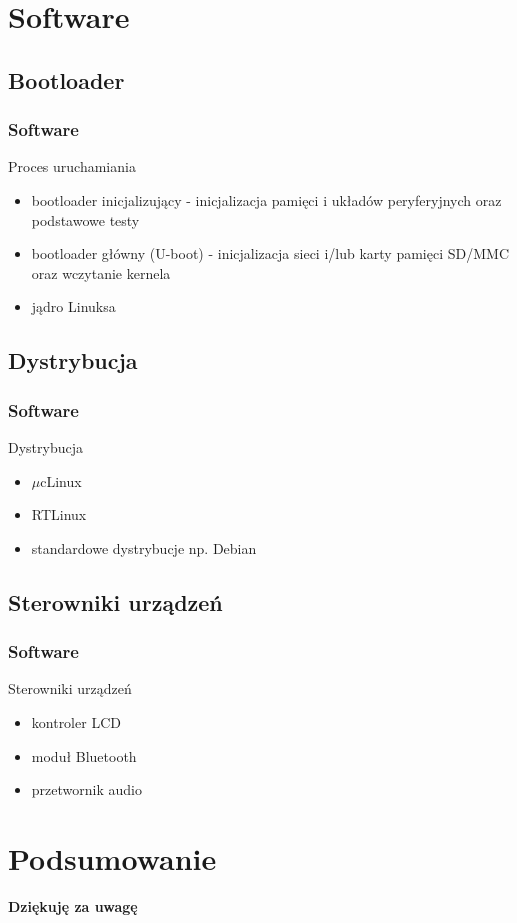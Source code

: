 \documentclass[xcolor=dvipsnames]{beamer}
\newenvironment{ramka}{\begin{frame}}
{
		\end{frame}
}
\begin{document}
	\section{Software}
	\subsection{Bootloader}
	\begin{ramka}
		\frametitle{Software}
		\begin{block}{Proces uruchamiania}
			\begin{itemize}
				\item<2-> bootloader inicjalizujący - inicjalizacja pamięci i układów peryferyjnych oraz podstawowe testy
				\item<3-> bootloader główny (U-boot) - inicjalizacja sieci i/lub karty pamięci SD/MMC oraz wczytanie kernela
				\item<4-> jądro Linuksa
			\end{itemize}
		\end{block}
	\end{ramka}
	
	\subsection{Dystrybucja}
	\begin{ramka}
		\frametitle{Software}
		\begin{block}{Dystrybucja}
			\begin{itemize}
				\item<1-> $\mu$cLinux
				\item<1-> RTLinux
				\item<1-> standardowe dystrybucje np. Debian
			\end{itemize}
		\end{block}
	\end{ramka}
	
	\subsection{Sterowniki urządzeń}
	\begin{ramka}
		\frametitle{Software}
		\begin{block}{Sterowniki urządzeń}
			\begin{itemize}
				\item<1-> kontroler LCD
				\item<1-> moduł Bluetooth
				\item<1-> przetwornik audio
			\end{itemize}
		\end{block}
	\end{ramka}
	
	\section*{Podsumowanie}
	\begin{ramka}
		\begin{center}
			\textbf{\Large{Dziękuję za uwagę}}
		\end{center}
	\end{ramka}
\end{document}
